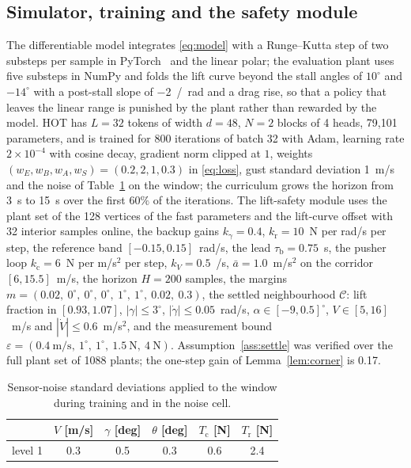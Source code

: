 \documentclass[final,5p,times,twocolumn]{elsarticle}
\newcommand{\numAmax}{1.0}
\newcommand{\numBatch}{32}
\newcommand{\numBlocks}{2}
\newcommand{\numCalHi}{0.5}
\newcommand{\numCalLo}{-9}
\newcommand{\numCgam}{3}
\newcommand{\numCgd}{0.05}
\newcommand{\numClfHi}{1.07}
\newcommand{\numClfLo}{0.93}
\newcommand{\numCvHi}{16}
\newcommand{\numCvLo}{5}
\newcommand{\numCvd}{0.6}
\newcommand{\numD}{48}
\newcommand{\numEps}{0.4\ \mathrm{m/s},\ 1^\circ,\ 1^\circ,\ 1.5\ \mathrm N,\ 4\ \mathrm N}
\newcommand{\numH}{200}
\newcommand{\numHeads}{4}
\newcommand{\numIters}{800}
\newcommand{\numKc}{6}
\newcommand{\numKgam}{0.4}
\newcommand{\numKr}{10}
\newcommand{\numKrGain}{0.17}
\newcommand{\numKv}{0.5}
\newcommand{\numL}{32}
\newcommand{\numLr}{$2\times10^{-4}$}
\newcommand{\numMargins}{0.02,\ 0^\circ,\ 0^\circ,\ 0^\circ,\ 1^\circ,\ 1^\circ,\ 0.02,\ 0.3}
\newcommand{\numParams}{79,101}
\newcommand{\numPlantsFull}{1088}
\newcommand{\numPlantsOnline}{128}
\newcommand{\numRhi}{0.15}
\newcommand{\numRlo}{-0.15}
\newcommand{\numSamplesOnline}{32}
\newcommand{\numTauB}{0.75}
\newcommand{\numVbhi}{15.5}
\newcommand{\numVblo}{6}
\newcommand{\numWA}{1}
\newcommand{\numWB}{2}
\newcommand{\numWE}{0.2}
\newcommand{\numWS}{0.3}
\begin{document}
\subsection{Simulator, training and the safety module}\label{sec:num}
The differentiable model integrates \eqref{eq:model} with a Runge--Kutta step of two substeps per sample in PyTorch~\cite{Paszke2019} and the linear polar; the evaluation plant uses five substeps in NumPy and folds the lift curve beyond the stall angles of $10^\circ$ and $-14^\circ$ with a post-stall slope of \SI{-2}{/rad} and a drag rise, so that a policy that leaves the linear range is punished by the plant rather than rewarded by the model. HOT has $L=\numL{}$ tokens of width $d=\numD{}$, $N=\numBlocks{}$ blocks of \numHeads{} heads, \numParams{} parameters, and is trained for \numIters{} iterations of batch \numBatch{} with Adam, learning rate \numLr{} with cosine decay, gradient norm clipped at $1$, weights $(w_E,w_B,w_A,w_S)=(\numWE,\numWB,\numWA,\numWS)$ in \eqref{eq:loss}, gust standard deviation \SI{1}{m/s} and the noise of Table~\ref{tab:noise} on the window; the curriculum grows the horizon from \SI{3}{s} to \SI{15}{s} over the first $60\%$ of the iterations. The lift-safety module uses the plant set of the \numPlantsOnline{} vertices of the fast parameters and the lift-curve offset with \numSamplesOnline{} interior samples online, the backup gains $k_\gamma=\numKgam$, $k_{\mathrm r}=\numKr$~N per rad/s per step, the reference band $[\numRlo,\numRhi]$~rad/s, the lead $\tau_{\mathrm b}=\numTauB$~s, the pusher loop $k_{\mathrm c}=\numKc$~N per m/s$^2$ per step, $k_V=\numKv$~/s, $\bar a=\numAmax$~m/s$^2$ on the corridor $[\numVblo,\numVbhi]$~m/s, the horizon $H=\numH{}$ samples, the margins $m=(\numMargins)$, the settled neighbourhood $\mathcal C$: lift fraction in $[\numClfLo,\numClfHi]$, $|\gamma|\le\numCgam^\circ$, $|\dot\gamma|\le\numCgd$~rad/s, $\alpha\in[\numCalLo,\numCalHi]^\circ$, $V\in[\numCvLo,\numCvHi]$~m/s and $|\dot V|\le\numCvd$~m/s$^2$, and the measurement bound $\varepsilon=(\numEps)$. Assumption~\ref{ass:settle} was verified over the full plant set of \numPlantsFull{} plants; the one-step gain of Lemma~\ref{lem:corner} is \numKrGain{}.
\begin{table}[t]\centering\footnotesize
\caption{Sensor-noise standard deviations applied to the window during training and in the noise cell.}\label{tab:noise}
\begin{tabular}{lccccc}\toprule
& $V$ [m/s] & $\gamma$ [deg] & $\theta$ [deg] & $T_{\mathrm c}$ [N] & $T_{\mathrm r}$ [N]\\\midrule
level 1 & 0.3 & 0.5 & 0.3 & 0.6 & 2.4\\
\bottomrule\end{tabular}\end{table}
\end{document}
